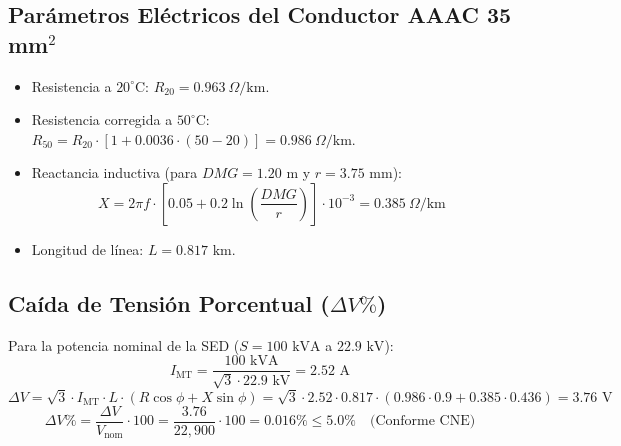 \documentclass[12pt,a4paper]{report}
\begin{document}
\subsection{Parámetros Eléctricos del Conductor AAAC 35 mm\texorpdfstring{$^2$}{2}}
\begin{itemize}
    \item Resistencia a $20^\circ\text{C}$: $R_{20} = 0.963\ \Omega/\text{km}$.
    \item Resistencia corregida a $50^\circ\text{C}$: $R_{50} = R_{20} \cdot [1 + 0.0036 \cdot (50 - 20)] = 0.986\ \Omega/\text{km}$.
    \item Reactancia inductiva (para $DMG = 1.20\text{ m}$ y $r = 3.75\text{ mm}$):
    \begin{equation}
        X = 2\pi f \cdot \left[ 0.05 + 0.2 \ln\left(\frac{DMG}{r}\right) \right] \cdot 10^{-3} = 0.385\ \Omega/\text{km}
    \end{equation}
    \item Longitud de línea: $L = 0.817\text{ km}$.
\end{itemize}

\subsection{Caída de Tensión Porcentual (\texorpdfstring{$\Delta V\%$}{Delta V\%})}
Para la potencia nominal de la SED ($S = 100\text{ kVA}$ a $22.9\text{ kV}$):
\begin{equation}
    I_{\text{MT}} = \frac{100\text{ kVA}}{\sqrt{3} \cdot 22.9\text{ kV}} = 2.52\text{ A}
\end{equation}
\begin{equation}
    \Delta V = \sqrt{3} \cdot I_{\text{MT}} \cdot L \cdot (R \cos\phi + X \sin\phi) = \sqrt{3} \cdot 2.52 \cdot 0.817 \cdot (0.986 \cdot 0.9 + 0.385 \cdot 0.436) = 3.76\text{ V}
\end{equation}
\begin{equation}
    \Delta V\% = \frac{\Delta V}{V_{\text{nom}}} \cdot 100 = \frac{3.76}{22,900} \cdot 100 = \mathbf{0.016\%} \le 5.0\% \quad \text{(Conforme CNE)}
\end{equation}
\end{document}
